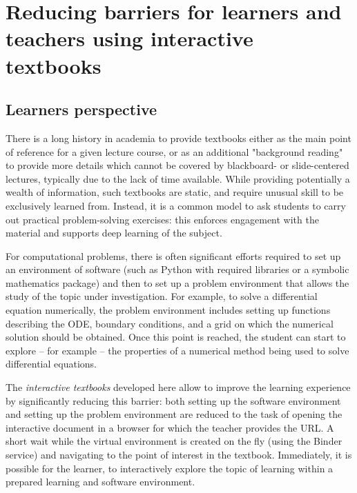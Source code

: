 \documentclass{deliverablereport}
\author{Hans Fangohr, Thomas Kluyver, Marijan Beg, Min
Ragan-Kelley, Vidar Fauske, Marcin Kostur, Jerzy \L{}uczka
 }
\begin{document}
\maketitle
\githubissuedescription
\newpage
\tableofcontents
\newpage

%

\section{Reducing barriers for learners and teachers using interactive textbooks}

\subsection{Learners perspective}

There is a long history in academia to provide textbooks either as
the main point of reference for a given lecture course, or as an
additional "background reading" to provide more details which cannot
be covered by blackboard- or slide-centered lectures, typically due to
the lack of time available.
%
While providing potentially a wealth of information, such textbooks
are static, and require unusual skill to be exclusively learned
from. Instead, it is a common model to ask students to carry out
practical problem-solving exercises: this enforces engagement with the
material and supports deep learning of the subject.

For computational problems, there is often significant efforts required
to set up an environment of software (such as Python with required
libraries or a symbolic mathematics package) and then to set up a
problem environment that allows the study of the topic under
investigation. For example, to solve a differential equation
numerically, the problem environment includes setting up functions
describing the ODE, boundary conditions, and a grid on which the
numerical solution should be obtained. Once this point is reached, the
student can start to explore -- for example -- the properties of a
numerical method being used to solve differential equations.

The \emph{interactive textbooks} developed here allow to improve the
learning experience by significantly reducing this barrier: both
setting up the software environment and setting up the problem
environment are reduced to the task of opening the interactive
document in a browser for which the teacher provides the URL. A short
wait while the virtual environment is created on the fly (using the
Binder service) and navigating to the point of interest in the
textbook. Immediately, it is possible for the learner, to
interactively explore the topic of learning within a prepared learning
and software environment.
\end{document}
